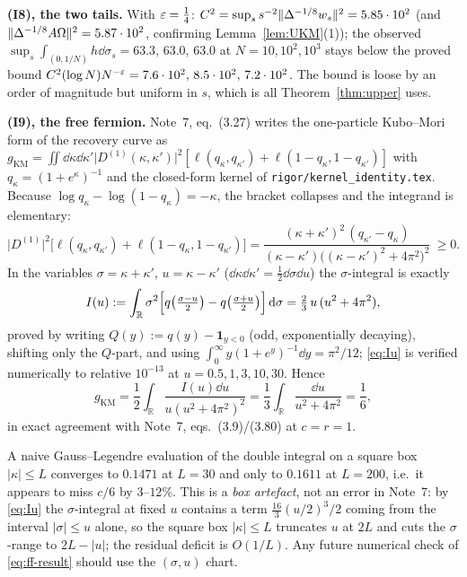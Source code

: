 \documentclass[11pt]{article}
\newcommand{\gKM}{g_{\mathrm{KM}}}\newcommand{\gB}{g_{\mathrm B}}
\newcommand{\one}{\mathbf 1}\newcommand{\dist}{\operatorname{dist}}
\begin{document}
\textbf{(I8), the two tails.}  With $\varepsilon=\frac14$: $C^2=\sup_ss^{-2}\lVert\Delta^{-1/8}w_s\rVert^2=5.85\cdot10^2$
(and $\lVert\Delta^{-1/8}A\Omega\rVert^2=5.87\cdot10^2$, confirming Lemma~\ref{lem:UKM}(1)); the observed
$\sup_s\int_{(0,1/N)}h\dd\sigma_s=63.3,\,63.0,\,63.0$ at $N=10,10^2,10^3$ stays below the proved bound
$C^2(\log N)N^{-\varepsilon}=7.6\cdot10^2,\,8.5\cdot10^2,\,7.2\cdot10^2$.  The bound is loose by an order of
magnitude but uniform in $s$, which is all Theorem~\ref{thm:upper} uses.

\textbf{(I9), the free fermion.}  Note~7, eq.~(3.27) writes the one-particle Kubo--Mori form of the
recovery curve as
$\gKM=\iint\dd\kappa\dd\kappa'\lvert D^{(1)}(\kappa,\kappa')\rvert^2
[\ell(q_\kappa,q_{\kappa'})+\ell(1-q_\kappa,1-q_{\kappa'})]$
with $q_\kappa=(1+e^{\kappa})^{-1}$ and the closed-form kernel of
\texttt{rigor/kernel\_identity.tex}.  Because $\log q_\kappa-\log(1-q_\kappa)=-\kappa$, the bracket collapses
and the integrand is elementary:
\begin{equation}\label{eq:ff-integrand}
 \lvert D^{(1)}\rvert^2\bigl[\ell(q_\kappa,q_{\kappa'})+\ell(1-q_\kappa,1-q_{\kappa'})\bigr]
 =\frac{(\kappa+\kappa')^2\,(q_{\kappa'}-q_\kappa)}{(\kappa-\kappa')\bigl((\kappa-\kappa')^2+4\pi^2\bigr)^2}\ \ge0 .
\end{equation}
In the variables $\sigma=\kappa+\kappa'$, $u=\kappa-\kappa'$ ($\dd\kappa\dd\kappa'=\frac12\dd\sigma\dd u$) the
$\sigma$-integral is exactly
\begin{equation}\label{eq:Iu}
 I(u):=\int_{\mathbb R}\sigma^2\Bigl[q\bigl(\tfrac{\sigma-u}2\bigr)-q\bigl(\tfrac{\sigma+u}2\bigr)\Bigr]\,\mathrm d\sigma
 =\tfrac23\,u\,(u^2+4\pi^2),
\end{equation}
proved by writing $Q(y):=q(y)-\one_{y<0}$ (odd, exponentially decaying), shifting only the $Q$-part, and
using $\int_0^\infty y(1+e^y)^{-1}\dd y=\pi^2/12$; \eqref{eq:Iu} is verified numerically to relative
$10^{-13}$ at $u=0.5,1,3,10,30$.  Hence
\begin{equation}\label{eq:ff-result}
 \gKM=\frac12\int_{\mathbb R}\frac{I(u)\dd u}{u(u^2+4\pi^2)^2}
 =\frac13\int_{\mathbb R}\frac{\dd u}{u^2+4\pi^2}=\frac16 ,
\end{equation}
in exact agreement with Note~7, eqs.~(3.9)/(3.80) at $c=r=1$.

\begin{verdictgap}
A naive Gauss--Legendre evaluation of the double integral on a square box $\lvert\kappa\rvert\le L$
converges to $0.1471$ at $L=30$ and only to $0.1611$ at $L=200$, i.e.\ it appears to miss $c/6$ by
$3$--$12\%$.  This is a \emph{box artefact}, not an error in Note~7: by \eqref{eq:Iu} the $\sigma$-integral
at fixed $u$ contains a term $\frac{16}{3}(u/2)^3/2$ coming from the interval
$\lvert\sigma\rvert\le u$ alone, so the square box $\lvert\kappa\rvert\le L$
truncates $u$ at $2L$ and cuts the $\sigma$-range to $2L-\lvert u\rvert$; the residual deficit is
$O(1/L)$.  Any future numerical check of \eqref{eq:ff-result} should use the $(\sigma,u)$ chart.
\end{verdictgap}
\end{document}
